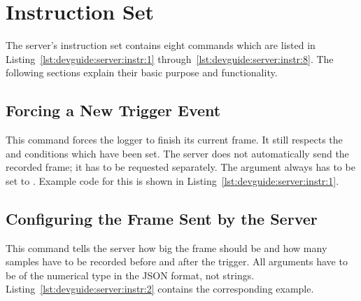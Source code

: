 \section{Instruction Set} %
\label{sec:devguide:server:instruction}

The     server's      instruction     set     contains      eight     commands
which     are      listed     in     Listing~\ref{lst:devguide:server:instr:1}
through~\ref{lst:devguide:server:instr:8}. The   following  sections   explain
their basic purpose and functionality.

\subsection{Forcing a New Trigger Event} %
\label{subsec:devguide:server:forcing_trigger}

This command forces the logger to  finish its current frame. It still respects
the  and  conditions which have been set.  The server does
not automatically send the recorded  frame; it has to be requested separately.
The argument  always has to be set to . Example
code for this is shown in Listing~\ref{lst:devguide:server:instr:1}.

\vfill
{}
\vfill

\clearpage
\subsection{Configuring the Frame Sent by the Server } %
\label{subsec:devguide:server:config_frame}

This  command  tells  the  server  how   big  the  frame  should  be  and  how
many  samples  have   to  be  recorded  before  and   after  the  trigger. All
arguments  have  to  be  of  the  numerical  type  in  the  JSON  format,  not
strings. Listing~\ref{lst:devguide:server:instr:2} contains  the corresponding
example.

